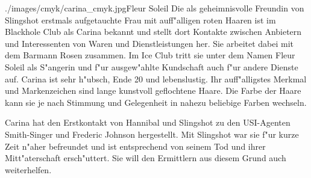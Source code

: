 
\begin{sideimagebox}[r]{0.6}{./images/cmyk/carina_cmyk.jpg}{Fleur Soleil}
    Die als geheimnisvolle Freundin von Slingshot erstmals aufgetauchte Frau mit auff"alligen roten Haaren ist im Blackhole Club als Carina bekannt und stellt dort Kontakte zwischen Anbietern und Interessenten von Waren und Dienstleistungen her. Sie arbeitet dabei mit dem Barmann Rosen zusammen. Im Ice Club tritt sie unter dem Namen Fleur Soleil als S"angerin und f"ur ausgew"ahlte Kundschaft auch f"ur andere Dienste auf. Carina ist sehr h"ubsch, Ende 20 und lebenslustig. Ihr auff"alligstes Merkmal und Markenzeichen sind lange kunstvoll geflochtene Haare. Die Farbe der Haare kann sie je nach Stimmung und Gelegenheit in nahezu beliebige Farben wechseln.

    Carina hat den Erstkontakt von Hannibal und Slingshot zu den USI-Agenten Smith-Singer und Frederic Johnson hergestellt. Mit Slingshot war sie f"ur kurze Zeit n"aher befreundet und ist entsprechend von seinem Tod und ihrer Mitt"aterschaft ersch"uttert. Sie will den Ermittlern aus diesem Grund auch weiterhelfen.
\end{sideimagebox}
\vfill\pagebreak
